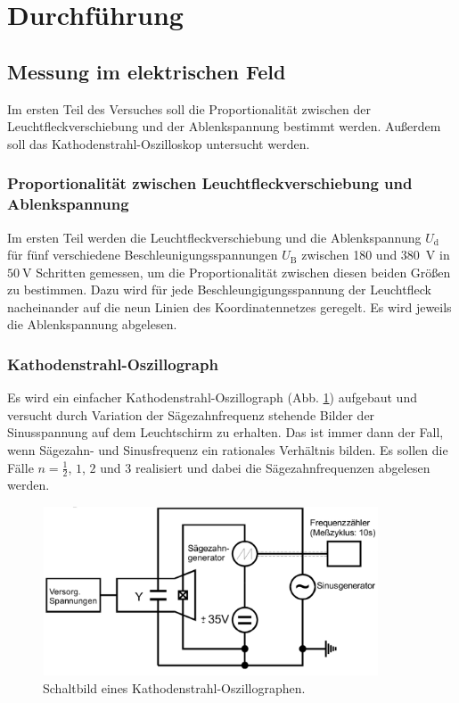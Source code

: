 \section{Durchführung}
\label{sec:Durchführung}

\subsection{Messung im elektrischen Feld}
Im ersten Teil des Versuches soll die Proportionalität zwischen
der Leuchtfleckverschiebung und der Ablenkspannung bestimmt werden.
Außerdem soll das Kathodenstrahl-Oszilloskop untersucht werden.

\subsubsection{Proportionalität zwischen Leuchtfleckverschiebung und Ablenkspannung}
Im ersten Teil werden die Leuchtfleckverschiebung und die 
Ablenkspannung $U_\text{d}$ für fünf verschiedene 
Beschleunigungsspannungen $U_\text{B}$ zwischen \num{180} und 
\SI{380}{\volt} in $\SI{50}{\volt}$ Schritten gemessen,
um die Proportionalität zwischen diesen beiden Größen zu
bestimmen. Dazu wird für jede Beschleungigungsspannung der
Leuchtfleck nacheinander auf die neun Linien des
Koordinatennetzes geregelt. Es wird jeweils die Ablenkspannung
abgelesen.

\subsubsection{Kathodenstrahl-Oszillograph}
Es wird ein einfacher Kathodenstrahl-Oszillograph (Abb. \ref{fig:oszillograph})
aufgebaut und versucht durch Variation der Sägezahnfrequenz 
stehende Bilder der Sinusspannung auf dem Leuchtschirm zu 
erhalten. Das ist immer dann der Fall, wenn Sägezahn- und 
Sinusfrequenz ein rationales Verhältnis bilden. Es sollen 
die Fälle $n = \frac{1}{2}$, $\num{1}$, $\num{2}$ und $\num{3}$ realisiert 
und dabei die Sägezahnfrequenzen abgelesen werden. 
\begin{figure}
    \centering
    \includegraphics[width=10cm, height=5cm]{build/V501_b.png}
    \caption{Schaltbild eines Kathodenstrahl-Oszillographen. \cite{V501}}
    \label{fig:oszillograph}
\end{figure}

